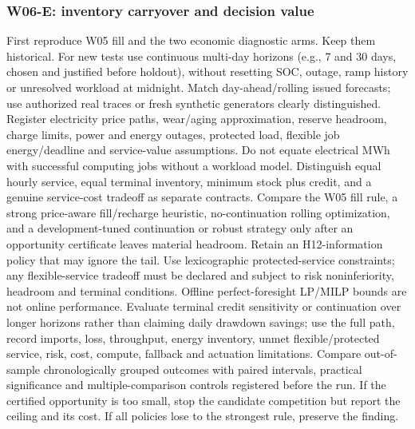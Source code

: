 \subsubsection{W06-E: inventory carryover and decision value}
First reproduce W05 fill and the two economic diagnostic arms. Keep them historical. For new tests use continuous multi-day horizons (e.g., 7 and 30 days, chosen and justified before holdout), without resetting SOC, outage, ramp history or unresolved workload at midnight. Match day-ahead/rolling issued forecasts; use authorized real traces or fresh synthetic generators clearly distinguished. Register electricity price paths, wear/aging approximation, reserve headroom, charge limits, power and energy outages, protected load, flexible job energy/deadline and service-value assumptions. Do not equate electrical MWh with successful computing jobs without a workload model. Distinguish equal hourly service, equal terminal inventory, minimum stock plus credit, and a genuine service-cost tradeoff as separate contracts. Compare the W05 fill rule, a strong price-aware fill/recharge heuristic, no-continuation rolling optimization, and a development-tuned continuation or robust strategy only after an opportunity certificate leaves material headroom. Retain an H12-information policy that may ignore the tail. Use lexicographic protected-service constraints; any flexible-service tradeoff must be declared and subject to risk noninferiority, headroom and terminal conditions. Offline perfect-foresight LP/MILP bounds are not online performance. Evaluate terminal credit sensitivity or continuation over longer horizons rather than claiming daily drawdown savings; use the full path, record imports, loss, throughput, energy inventory, unmet flexible/protected service, risk, cost, compute, fallback and actuation limitations. Compare out-of-sample chronologically grouped outcomes with paired intervals, practical significance and multiple-comparison controls registered before the run. If the certified opportunity is too small, stop the candidate competition but report the ceiling and its cost. If all policies lose to the strongest rule, preserve the finding.

